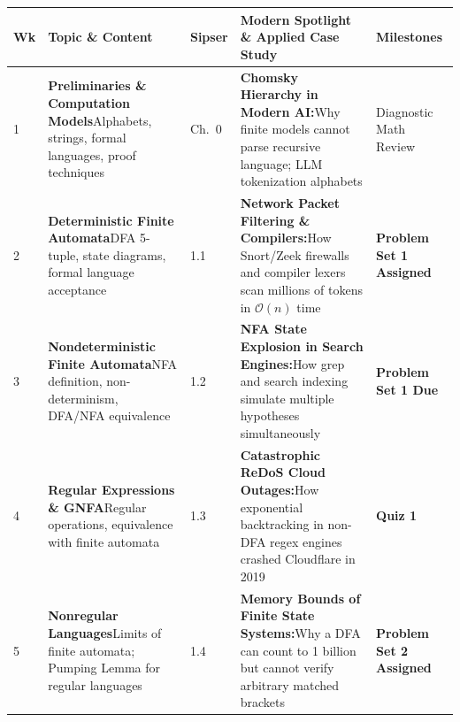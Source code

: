 \documentclass[11pt,a4paper]{article}
\begin{document}
{\small
{}
\begin{longtable}{@{} C{0.6cm} L{3.5cm} C{1.3cm} L{5.2cm} L{3.6cm} @{}}
    \hline
    \color{white}\textbf{Wk} & \color{white}\textbf{Topic \& Content} & \color{white}\textbf{Sipser} & \color{white}\textbf{Modern Spotlight \& Applied Case Study} & \color{white}\textbf{Milestones} \\
    \hline
    \endhead

    1 & \textbf{Preliminaries \& Computation Models}\newline Alphabets, strings, formal languages, proof techniques & Ch.~0 & \textbf{Chomsky Hierarchy in Modern AI:}\newline Why finite models cannot parse recursive language; LLM tokenization alphabets & Diagnostic Math Review \\

    2 & \textbf{Deterministic Finite Automata}\newline DFA 5-tuple, state diagrams, formal language acceptance & 1.1 & \textbf{Network Packet Filtering \& Compilers:}\newline How Snort/Zeek firewalls and compiler lexers scan millions of tokens in $\mathcal{O}(n)$ time & \textbf{Problem Set 1 Assigned} \\

    3 & \textbf{Nondeterministic Finite Automata}\newline NFA definition, non-determinism, DFA/NFA equivalence & 1.2 & \textbf{NFA State Explosion in Search Engines:}\newline How grep and search indexing simulate multiple hypotheses simultaneously & \textbf{Problem Set 1 Due} \\

    4 & \textbf{Regular Expressions \& GNFA}\newline Regular operations, equivalence with finite automata & 1.3 & \textbf{Catastrophic ReDoS Cloud Outages:}\newline How exponential backtracking in non-DFA regex engines crashed Cloudflare in 2019 & \textbf{Quiz 1} \\

    5 & \textbf{Nonregular Languages}\newline Limits of finite automata; Pumping Lemma for regular languages & 1.4 & \textbf{Memory Bounds of Finite State Systems:}\newline Why a DFA can count to 1 billion but cannot verify arbitrary matched brackets & \textbf{Problem Set 2 Assigned} \\


\end{longtable}}
\end{document}
